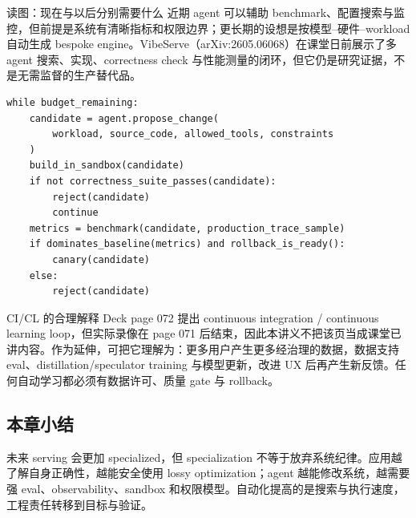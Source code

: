 
\begin{knowledgebox}{读图：现在与以后分别需要什么}
近期 agent 可以辅助 benchmark、配置搜索与监控，但前提是系统有清晰指标和权限边界；更长期的设想是按模型--硬件--workload 自动生成 bespoke engine。VibeServe（arXiv:2605.06068）在课堂日前展示了多 agent 搜索、实现、correctness check 与性能测量的闭环，但它仍是研究证据，不是无需监督的生产替代品。
\end{knowledgebox}

\begin{lstlisting}[caption={Agentic inference engineering 的安全闭环}]
while budget_remaining:
    candidate = agent.propose_change(
        workload, source_code, allowed_tools, constraints
    )
    build_in_sandbox(candidate)
    if not correctness_suite_passes(candidate):
        reject(candidate)
        continue
    metrics = benchmark(candidate, production_trace_sample)
    if dominates_baseline(metrics) and rollback_is_ready():
        canary(candidate)
    else:
        reject(candidate)
\end{lstlisting}

\begin{importantbox}{CI/CL 的合理解释}
Deck page 072 提出 continuous integration / continuous learning loop，但实际录像在 page 071 后结束，因此本讲义不把该页当成课堂已讲内容。作为延伸，可把它理解为：更多用户产生更多经治理的数据，数据支持 eval、distillation/speculator training 与模型更新，改进 UX 后再产生新反馈。任何自动学习都必须有数据许可、质量 gate 与 rollback。
\end{importantbox}

\subsection{本章小结}

未来 serving 会更加 specialized，但 specialization 不等于放弃系统纪律。应用越了解自身正确性，越能安全使用 lossy optimization；agent 越能修改系统，越需要强 eval、observability、sandbox 和权限模型。自动化提高的是搜索与执行速度，工程责任转移到目标与验证。

